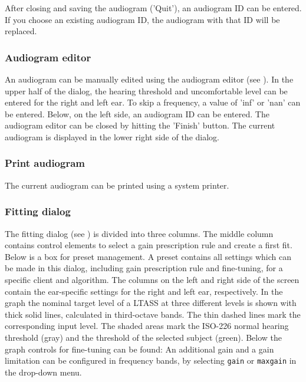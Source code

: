 \documentclass[11pt,a4paper,twoside]{article}
\begin{document}
After closing and saving the audiogram ('Quit'), an audiogram ID can
be entered.
%
If you choose an existing audiogram ID, the audiogram with that ID will
be replaced.


\subsubsection*{Audiogram editor}

An audiogram can be manually edited using the audiogram editor (see
).
%
In the upper half of the dialog, the hearing threshold and
uncomfortable level can be entered for the right and left ear.
%
To skip a frequency, a value of 'inf' or 'nan' can be entered.
%
Below, on the left side, an audiogram ID can be entered.
%
The audiogram editor can be closed by hitting the 'Finish' button.
%
The current audiogram is displayed in the lower right side of the
dialog.


\subsubsection*{Print audiogram}

The current audiogram can be printed using a system printer.

\subsubsection*{Fitting dialog}

The fitting dialog (see ) is
divided into three columns. The middle column contains control
elements to select a gain prescription rule and create a first
fit. Below is a box for preset management. A preset contains all
settings which can be made in this dialog, including gain prescription
rule and fine-tuning, for a specific client and algorithm.  The
columns on the left and right side of the screen contain the
ear-specific settings for the right and left ear, respectively. In the
graph the nominal target level of a LTASS at three different levels is
shown with thick solid lines, calculated in third-octave bands. The
thin dashed lines mark the corresponding input level. The shaded areas
mark the ISO-226 normal hearing threshold (gray) and the threshold of
the selected subject (green). Below the graph controls for fine-tuning
can be found: An additional gain and a gain limitation can be
configured in frequency bands, by selecting \verb!gain! or
\verb!maxgain! in the drop-down menu.
\end{document}
